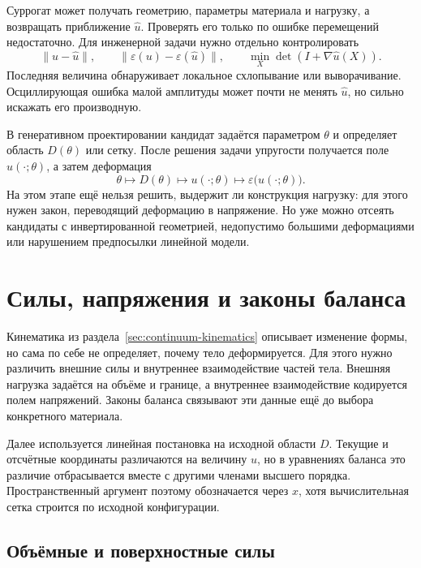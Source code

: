 \begin{mlconnection}
Суррогат может получать геометрию, параметры материала и нагрузку, а возвращать приближение $\widehat u$. Проверять его только по ошибке перемещений недостаточно. Для инженерной задачи нужно отдельно контролировать
\[
\lVert u-\widehat u\rVert,
\qquad
\lVert\varepsilon(u)-\varepsilon(\widehat u)\rVert,
\qquad
\min_X\det(I+\nabla\widehat u(X)).
\]
Последняя величина обнаруживает локальное схлопывание или выворачивание. Осциллирующая ошибка малой амплитуды может почти не менять $\widehat u$, но сильно искажать его производную.
\end{mlconnection}

В генеративном проектировании кандидат задаётся параметром $\theta$ и определяет область $D(\theta)$ или сетку. После решения задачи упругости получается поле $u(\cdot;\theta)$, а затем деформация
\begin{equation}
\label{eq:design-to-strain-v01}
\theta
\longmapsto
D(\theta)
\longmapsto
u(\cdot;\theta)
\longmapsto
\varepsilon\bigl(u(\cdot;\theta)\bigr).
\end{equation}
На этом этапе ещё нельзя решить, выдержит ли конструкция нагрузку: для этого нужен закон, переводящий деформацию в напряжение. Но уже можно отсеять кандидаты с инвертированной геометрией, недопустимо большими деформациями или нарушением предпосылки линейной модели.

\section{Силы, напряжения и законы баланса}
\label{sec:continuum-stress-balance}

Кинематика из раздела~\ref{sec:continuum-kinematics} описывает изменение формы, но сама по себе не определяет, почему тело деформируется. Для этого нужно различить внешние силы и внутреннее взаимодействие частей тела. Внешняя нагрузка задаётся на объёме и границе, а внутреннее взаимодействие кодируется полем напряжений. Законы баланса связывают эти данные ещё до выбора конкретного материала.

Далее используется линейная постановка на исходной области $D$. Текущие и отсчётные координаты различаются на величину $u$, но в уравнениях баланса это различие отбрасывается вместе с другими членами высшего порядка. Пространственный аргумент поэтому обозначается через $x$, хотя вычислительная сетка строится по исходной конфигурации.

\subsection{Объёмные и поверхностные силы}

